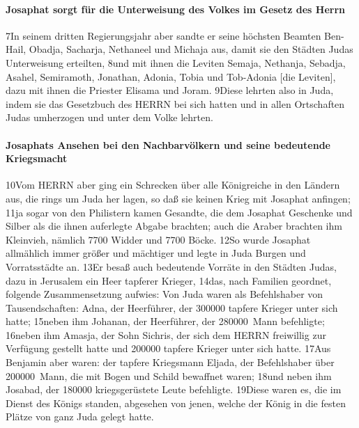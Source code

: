 \hypertarget{josaphat-sorgt-fuxfcr-die-unterweisung-des-volkes-im-gesetz-des-herrn}{%
\paragraph{Josaphat sorgt für die Unterweisung des Volkes im Gesetz des
Herrn}\label{josaphat-sorgt-fuxfcr-die-unterweisung-des-volkes-im-gesetz-des-herrn}}

7In seinem dritten Regierungsjahr aber sandte er seine höchsten Beamten
Ben-Hail, Obadja, Sacharja, Nethaneel und Michaja aus, damit sie den
Städten Judas Unterweisung erteilten, 8und mit ihnen die Leviten Semaja,
Nethanja, Sebadja, Asahel, Semiramoth, Jonathan, Adonia, Tobia und
Tob-Adonia {[}die Leviten{]}, dazu mit ihnen die Priester Elisama und
Joram. 9Diese lehrten also in Juda, indem sie das Gesetzbuch des HERRN
bei sich hatten und in allen Ortschaften Judas umherzogen und unter dem
Volke lehrten.

\hypertarget{josaphats-ansehen-bei-den-nachbarvuxf6lkern-und-seine-bedeutende-kriegsmacht}{%
\paragraph{Josaphats Ansehen bei den Nachbarvölkern und seine bedeutende
Kriegsmacht}\label{josaphats-ansehen-bei-den-nachbarvuxf6lkern-und-seine-bedeutende-kriegsmacht}}

10Vom HERRN aber ging ein Schrecken über alle Königreiche in den Ländern
aus, die rings um Juda her lagen, so daß sie keinen Krieg mit Josaphat
anfingen; 11ja sogar von den Philistern kamen Gesandte, die dem Josaphat
Geschenke und Silber als die ihnen auferlegte Abgabe brachten; auch die
Araber brachten ihm Kleinvieh, nämlich 7700 Widder und 7700 Böcke. 12So
wurde Josaphat allmählich immer größer und mächtiger und legte in Juda
Burgen und Vorratsstädte an. 13Er besaß auch bedeutende Vorräte in den
Städten Judas, dazu in Jerusalem ein Heer tapferer Krieger, 14das, nach
Familien geordnet, folgende Zusammensetzung aufwies: Von Juda waren als
Befehlshaber von Tausendschaften: Adna, der Heerführer, der 300000
tapfere Krieger unter sich hatte; 15neben ihm Johanan, der Heerführer,
der 280000~Mann befehligte; 16neben ihm Amasja, der Sohn Sichris, der
sich dem HERRN freiwillig zur Verfügung gestellt hatte und 200000
tapfere Krieger unter sich hatte. 17Aus Benjamin aber waren: der tapfere
Kriegsmann Eljada, der Befehlshaber über 200000~Mann, die mit Bogen und
Schild bewaffnet waren; 18und neben ihm Josabad, der 180000
kriegsgerüstete Leute befehligte. 19Diese waren es, die im Dienst des
Königs standen, abgesehen von jenen, welche der König in die festen
Plätze von ganz Juda gelegt hatte.

